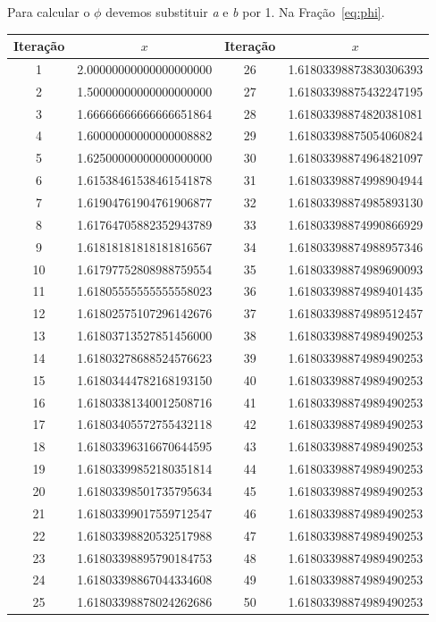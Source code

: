 \documentclass[a4paper]{article}
\begin{document}
	Para calcular o $\phi$ devemos substituir \emph{a} e \emph{b} por 1. Na
	Fração~\ref{eq:phi}.

\begin{table}[H]
	\centering
	\begin{tabular}{|c|c|c|c|}

		\hline
		Iteração & $x$ & Iteração & $x$ \\
		\hline
		1 & 2.00000000000000000000 & 26 & 1.61803398873830306393 \\
		\hline
		2 & 1.50000000000000000000 & 27 & 1.61803398875432247195 \\
		\hline
		3 & 1.66666666666666651864 & 28 & 1.61803398874820381081 \\
		\hline
		4 & 1.60000000000000008882 & 29 & 1.61803398875054060824 \\
		\hline
		5 & 1.62500000000000000000 & 30 & 1.61803398874964821097 \\
		\hline
		6 & 1.61538461538461541878 & 31 & 1.61803398874998904944 \\
		\hline
		7 & 1.61904761904761906877 & 32 & 1.61803398874985893130 \\
		\hline
		8 & 1.61764705882352943789 & 33 & 1.61803398874990866929 \\
		\hline
		9 & 1.61818181818181816567 & 34 & 1.61803398874988957346 \\
		\hline
		10 & 1.61797752808988759554 & 35 & 1.61803398874989690093 \\
		\hline
		11 & 1.61805555555555558023 & 36 & 1.61803398874989401435 \\
		\hline
		12 & 1.61802575107296142676 & 37 & 1.61803398874989512457 \\
		\hline
		13 & 1.61803713527851456000 & 38 & 1.61803398874989490253 \\
		\hline
		14 & 1.61803278688524576623 & 39 & 1.61803398874989490253 \\
		\hline
		15 & 1.61803444782168193150 & 40 & 1.61803398874989490253 \\
		\hline
		16 & 1.61803381340012508716 & 41 & 1.61803398874989490253 \\
		\hline
		17 & 1.61803405572755432118 & 42 & 1.61803398874989490253 \\
		\hline
		18 & 1.61803396316670644595 & 43 & 1.61803398874989490253 \\
		\hline
		19 & 1.61803399852180351814 & 44 & 1.61803398874989490253 \\
		\hline
		20 & 1.61803398501735795634 & 45 & 1.61803398874989490253 \\
		\hline
		21 & 1.61803399017559712547 & 46 & 1.61803398874989490253 \\
		\hline
		22 & 1.61803398820532517988 & 47 & 1.61803398874989490253 \\
		\hline
		23 & 1.61803398895790184753 & 48 & 1.61803398874989490253 \\
		\hline
		24 & 1.61803398867044334608 & 49 & 1.61803398874989490253 \\
		\hline
		25 & 1.61803398878024262686 & 50 & 1.61803398874989490253 \\
		\hline


\end{tabular}
\end{table}
\end{document}
